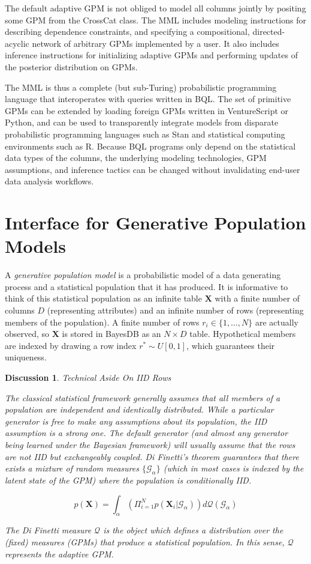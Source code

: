 \documentclass[10pt,letterpaper]{article}
\newtheorem{discussion}{Discussion}[section]
\newcommand{\set}[1]{\{#1\}}
\begin{document}
The default adaptive GPM is not obliged to model all columns jointly by
positing some GPM from the CrossCat class. The MML includes modeling
instructions for describing dependence constraints, and specifying a
compositional, directed-acyclic network of arbitrary GPMs implemented by a user.
It also includes inference instructions for initializing adaptive GPMs and
performing updates of the posterior distribution on GPMs.

The MML is thus a complete (but sub-Turing) probabilistic programming language
that interoperates with queries written in BQL. The set of primitive GPMs can be
extended by loading foreign GPMs written in VentureScript or Python, and can be used to
transparently integrate models from disparate probabilistic programming
languages such as Stan and statistical computing environments such as R. Because
BQL programs only depend on the statistical data types of the columns, the
underlying modeling technologies, GPM assumptions, and inference tactics can be
changed without invalidating end-user data analysis workflows.

\section{Interface for Generative Population Models} \label{sec:generators}
A \textit{generative population model} is a probabilistic model of a data
generating process and a statistical population that it has produced. It is
informative to think of this statistical population as an infinite table
$\mathbf{X}$ with a finite number of columns $D$ (representing attributes) and
an infinite number of rows (representing members of the population). A finite
number of rows $r_i \in
\set{1,\dots,N}$ are actually observed, so $\mathbf{X}$ is stored in BayesDB as
an $N \times D$ table. Hypothetical members are indexed by drawing a row index
$r^*\sim U[0,1]$, which guarantees their uniqueness.

\begin{discussion} \label{disc:iid} Technical Aside On IID Rows

The classical statistical framework generally assumes that all members of a
population are independent and identically distributed. While a particular
generator is free to make any assumptions about its population, the IID
assumption is a strong one. The default generator (and almost any generator
being learned under the Bayesian framework) will usually assume that the rows
are not IID but exchangeably coupled. Di Finetti's theorem guarantees that there
exists a mixture of random measures $\set{\mathcal{G}_\alpha}$ (which in most
cases is indexed by the latent state of the GPM) where the population is
conditionally IID.

$$p(\mathbf{X}) = \int_\alpha{(\Pi_{i=1}^Np(\mathbf{X}_i|\mathcal{G}_\alpha))d
\mathcal{Q}(\mathcal{G}_\alpha)}$$

The Di Finetti measure $\mathcal{Q}$ is the object which defines a distribution
over the (fixed) measures (GPMs) that produce a statistical population. In this
sense, $\mathcal{Q}$ represents the adaptive GPM.

\end{discussion}
\end{document}
